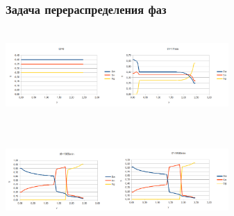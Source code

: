 \documentclass[10pt,pdf,hyperref={unicode}]{beamer} %
\begin{document}
\begin{frame}
\frametitle{Задача перераспределения фаз}
\begin{center}
 \includegraphics[width=8.5cm,height=3.5cm]{test1_1}
\end{center}
\begin{center}
 \includegraphics[width=8.5cm,height=3.5cm]{test1_4}
\end{center}
\begin{center}
\end{center}
\end{frame}
\end{document}
